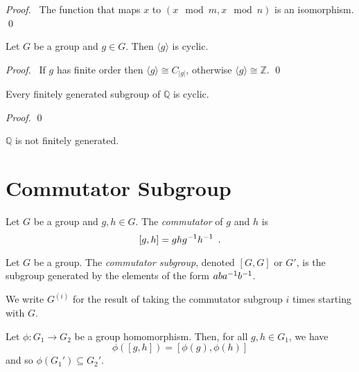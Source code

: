 \begin{proof}
    \pf\ The function that maps $x$ to $(x \mod m, x \mod n)$ is an isomorphism. \qed
\end{proof}

\begin{prop}
Let $G$ be a group and $g \in G$. Then $\langle g \rangle$ is cyclic.
\end{prop}

\begin{proof}
\pf\ If $g$ has finite order then $\langle g \rangle \cong C_{|g|}$, otherwise $\langle g \rangle \cong \mathbb{Z}$. \qed
\end{proof}

\begin{prop}
Every finitely generated subgroup of $\mathbb{Q}$ is cyclic.
\end{prop}

\begin{proof}
\pf
{}
\qed
\end{proof}

\begin{cor}
$\mathbb{Q}$ is not finitely generated.
\end{cor}

\section{Commutator Subgroup}

\begin{df}[Commutator]
Let $G$ be a group and $g,h \in G$. The \emph{commutator} of $g$ and $h$ is
\[ [g,h] = gh{g}^{-1} {h}^{-1} \enspace . \]
\end{df}

\begin{df}
Let $G$ be a group. The \emph{commutator subgroup}, denoted $[G,G]$ or $G'$, is the subgroup generated by the elements of the form $ab{a}^{-1}{b}^{-1}$.
 
We write $G^{(i)}$ for the result of taking the commutator subgroup $i$ times starting with $G$.
\end{df}

\begin{lm}
\label{lm:commutator-characteristic}
Let $\phi : G_1 \rightarrow G_2$ be a group homomorphism. Then, for all $g,h \in G_1$, we have
\[ \phi([g,h]) = [\phi(g), \phi(h)] \]
and so $\phi(G_1') \subseteq G_2'$.
\end{lm}

